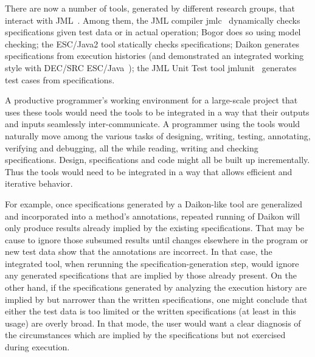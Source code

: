 \documentclass{sig-alternate}
\begin{document}
There are now a number of tools, generated by different research
groups, that interact with JML~\cite{Burdy-etal03}.  Among them, the
JML compiler jmlc~\cite{Cheon-Leavens02b} dynamically checks
specifications given test data or in actual operation; 
Bogor \cite{Bogor03} does so using model checking;
the ESC/Java2 tool statically checks specifications;
Daikon \cite{Ernst-etal01} generates specifications from execution histories (and demonstrated an
integrated working style
with DEC/SRC ESC/Java~\cite{NimmerErnst01});
the JML Unit Test tool jmlunit~\cite{Cheon-Leavens02} generates test
cases from specifications.
 
A productive programmer's working environment for a large-scale
project that uses these tools would need the tools to be integrated in
a way that their outputs and inputs seamlessly inter-communicate.  A
programmer using the tools would naturally move among the various
tasks of designing, writing,
testing, annotating, verifying and debugging, all the while reading, writing
and checking specifications.  Design, specifications and code might all
be built up incrementally.  Thus the tools would
need to be integrated in a way that allows efficient and iterative
behavior.

For example, once specifications generated by a Daikon-like tool are
generalized and incorporated into a method's annotations, repeated
running of Daikon will only produce results already implied by the
existing specifications.  That may be cause to ignore those subsumed
results until changes elsewhere in the program or new test data show
that the annotations are incorrect.  In that case, the integrated tool,
when rerunning the specification-generation step, would ignore any
generated specifications that are implied by those already present.
On the other hand, if the
specifications generated by analyzing the execution history are
implied by but narrower than the written specifications, one might
conclude that either the test data is too limited or the written
specifications (at least in this usage) are overly broad.  In that mode,
the user would want a clear diagnosis of the circumstances which
are implied by the specifications but not exercised during execution. 

\end{document}
